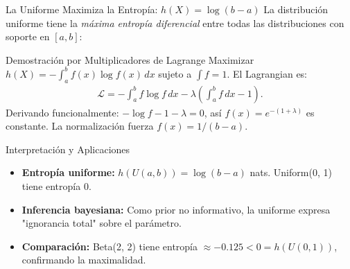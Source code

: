 \documentclass[10pt, aspectratio=169]{beamer}
\begin{document}
\begin{frame}{La Uniforme Maximiza la Entropía: $h(X) = \log(b-a)$}
  \footnotesize
  La distribución uniforme tiene la \emph{máxima entropía diferencial} entre todas las distribuciones con soporte en $[a, b]$: \pause

  \vspace{0.1cm}
  \begin{block}{Demostración por Multiplicadores de Lagrange}
    Maximizar $h(X) = -\int_{a}^{b} f(x) \log f(x)\,dx$ sujeto a $\int f = 1$. El Lagrangian es:
    \begin{align*}
      \mathcal{L} = -\int_{a}^{b} f \log f\,dx - \lambda \left( \int_{a}^{b} f\,dx - 1 \right).
    \end{align*}
    Derivando funcionalmente: $-\log f - 1 - \lambda = 0$, así $f(x) = e^{-(1+\lambda)}$ es constante. La normalización fuerza $f(x) = 1/(b-a)$.
  \end{block}

  \vspace{0.1cm}
  \pause
  \begin{alertblock}{Interpretación y Aplicaciones}
    \begin{itemize}\itemsep=0.05cm
      \item \textbf{Entropía uniforme:} $h(U(a,b)) = \log(b-a)$ nats. Uniform(0, 1) tiene entropía 0.
      \item \textbf{Inferencia bayesiana:} Como prior no informativo, la uniforme expresa "ignorancia total" sobre el parámetro.
      \item \textbf{Comparación:} Beta(2, 2) tiene entropía $\approx -0.125 < 0 = h(U(0,1))$, confirmando la maximalidad.
    \end{itemize}
  \end{alertblock}
\end{frame}
\end{document}
